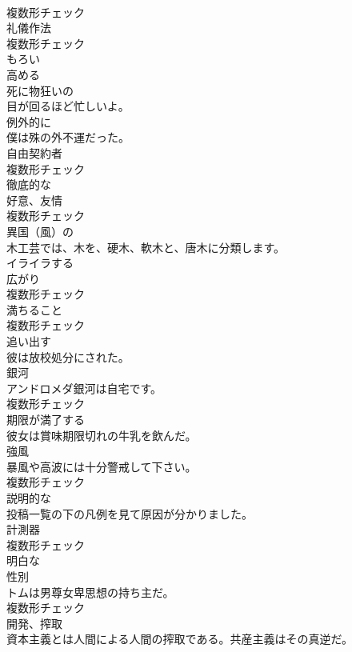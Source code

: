 \documentclass[8pt]{extreport}
\begin{document}
\begin{CJK}{UTF8}{min}
\\	複数形チェック
\\	[名詞]	礼儀作法	
\\	複数形チェック
\\	[形容詞]	もろい	
\\	[動詞]	高める	
\\	[形容詞]	死に物狂いの	
\\	目が回るほど忙しいよ。	
\\	[副詞]	例外的に	
\\	僕は殊の外不運だった。	
\\	[名詞]	自由契約者	
\\	複数形チェック
\\	[形容詞]	徹底的な	
\\	[名詞]	好意、友情	
\\	複数形チェック
\\	[形容詞]	異国（風）の	
\\	木工芸では、木を、硬木、軟木と、唐木に分類します。	
\\	[形容詞]	イライラする	
\\	[名詞]	広がり	
\\	複数形チェック
\\	[名詞]	満ちること	
\\	複数形チェック
\\	[動詞]	追い出す	
\\	彼は放校処分にされた。	
\\	[名詞]	銀河	
\\	アンドロメダ銀河は自宅です。	
\\	複数形チェック
\\	[動詞]	期限が満了する	
\\	彼女は賞味期限切れの牛乳を飲んだ。	
\\	[名詞]	強風	
\\	暴風や高波には十分警戒して下さい。	
\\	複数形チェック
\\	[形容詞]	説明的な	
\\	投稿一覧の下の凡例を見て原因が分かりました。	
\\	[名詞]	計測器	
\\	複数形チェック
\\	[形容詞]	明白な	
\\	[名詞]	性別	
\\	トムは男尊女卑思想の持ち主だ。	
\\	複数形チェック
\\	[名詞]	開発、搾取	
\\	資本主義とは人間による人間の搾取である。共産主義はその真逆だ。	

\end{CJK}
\end{document}
